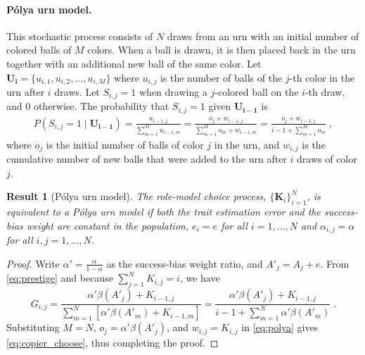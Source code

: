 \documentclass[12pt]{extarticle}
\let\vec\mathbf
\newtheorem{result}{Result}
\begin{document}
\paragraph{P\'{o}lya urn model.}
This stochastic process consists of $N$ draws from an urn with an initial {number} of colored balls of $M$ colors. When a ball is drawn, it is then placed back in the urn together with an additional new ball of the same color.
Let $\vec{U_i} = \{u_{i,1},u_{i,2},...,u_{i,M}\}$  where $u_{i,j}$ is the number of balls of the $j$-th color in the urn after $i$ draws.
Let $S_{i,j}=1$ when drawing a $j$-colored ball on the $i$-th draw, and $0$ otherwise. The probability that $S_{i,j}=1$ given $\vec{U_{i-1}}$ is
\begin{equation}\label{eq:polya}
\begin{split}
P(S_{i,j} = 1 \mid \vec{U_{i-1}}) = 
\frac{u_{i-1,j}}{\sum\limits_{m=1}^{M} u_{i-1,m}} = 
\frac{o_j + w_{i-1,j}}{\sum\limits_{m=1}^{M} o_m + w_{i-1,m}} = 
\frac{o_j + w_{i-1,j}}{i-1 + \sum\limits_{m=1}^{M} o_m} \;,
\end{split}
\end{equation}
where $o_j$ is the initial number of balls of color $j$ in the urn, and $w_{i,j}$ is the cumulative number of new balls that were added to the urn after $i$ draws of color $j$.
\\

\begin{result}[P{\'{o}}lya urn model]\label{result:polya}
The role-model choice process, $\big\{\vec{K}_i\big\}_{i=1}^N$, is equivalent to a \emph{P\'{o}lya urn model} if both the trait estimation error and the success-bias weight are constant in the population, $e_i=e$ for all $i=1, \ldots, N$ and $\alpha_{i,j}=\alpha$  for all $i,j=1, \ldots, N$.
\end{result}

\begin{proof} 
{Write} $\alpha'=\frac{\alpha}{1-\alpha}$ as the success-bias weight ratio, and $A'_j=A_j+e$. From \cref{eq:prestige} and because $\sum_{j=1}^{N}{K_{i,j}}=i$, we have
\begin{equation}\label{eq:copier_choose}
G_{i,j} = 
\frac{\alpha'\beta(A'_j) + K_{i-1,j}}{\sum\limits_{m=1}^{N}{\left[ \alpha'\beta(A'_m) + K_{i-1,m}\right]}}
 =\frac{\alpha'\beta(A'_j) + K_{i-1,j}}{i-1 + \sum\limits_{m=1}^{N}\alpha'\beta(A'_m)} \;.
\end{equation}
Substituting $M=N$, $o_j = \alpha'\beta(A'_j)$, and $w_{i,j} = K_{i,j}$ in \cref{eq:polya} gives \cref{eq:copier_choose}, thus completing the proof.
\end{proof} 
\end{document}
